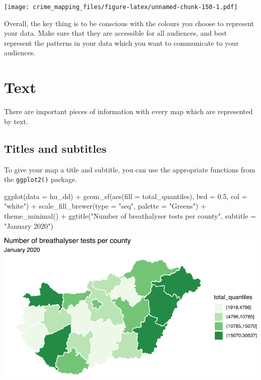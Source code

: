 \documentclass[
]{book}
\newenvironment{Shaded}{\begin{snugshade}}{\end{snugshade}}
\newcommand{\AttributeTok}[1]{\textcolor[rgb]{0.77,0.63,0.00}{#1}}
\newcommand{\FloatTok}[1]{\textcolor[rgb]{0.00,0.00,0.81}{#1}}
\newcommand{\FunctionTok}[1]{\textcolor[rgb]{0.00,0.00,0.00}{#1}}
\newcommand{\NormalTok}[1]{#1}
\newcommand{\SpecialCharTok}[1]{\textcolor[rgb]{0.00,0.00,0.00}{#1}}
\newcommand{\StringTok}[1]{\textcolor[rgb]{0.31,0.60,0.02}{#1}}
\begin{document}
\texttt{[image: crime\_mapping\_files/figure-latex/unnamed-chunk-150-1.pdf]}

Overall, the key thing is to be conscious with the colours you choose to represent your data. Make sure that they are accessible for all audiences, and best represent the patterns in your data which you want to communicate to your audiences.

\hypertarget{text}{%
\section{Text}\label{text}}

There are important pieces of information with every map which are represented by text.

\hypertarget{titles-and-subtitles}{%
\subsection{Titles and subtitles}\label{titles-and-subtitles}}

To give your map a title and subtitle, you can use the appropriate functions from the \texttt{ggplot2()} package.

\begin{Shaded}
\begin{Highlighting}[]
\FunctionTok{ggplot}\NormalTok{(}\AttributeTok{data =}\NormalTok{ hu\_dd) }\SpecialCharTok{+} 
  \FunctionTok{geom\_sf}\NormalTok{(}\FunctionTok{aes}\NormalTok{(}\AttributeTok{fill =}\NormalTok{ total\_quantiles), }\AttributeTok{lwd =} \FloatTok{0.5}\NormalTok{, }\AttributeTok{col =} \StringTok{"white"}\NormalTok{) }\SpecialCharTok{+} 
  \FunctionTok{scale\_fill\_brewer}\NormalTok{(}\AttributeTok{type =} \StringTok{"seq"}\NormalTok{, }\AttributeTok{palette =} \StringTok{"Greens"}\NormalTok{) }\SpecialCharTok{+} 
  \FunctionTok{theme\_minimal}\NormalTok{() }\SpecialCharTok{+} 
  \FunctionTok{ggtitle}\NormalTok{(}\StringTok{"Number of breathalyser tests per county"}\NormalTok{, }\AttributeTok{subtitle =} \StringTok{"January 2020"}\NormalTok{)}
\end{Highlighting}
\end{Shaded}

\includegraphics{crime_mapping_files/figure-latex/titlesubtitle-1.pdf}
\end{document}
